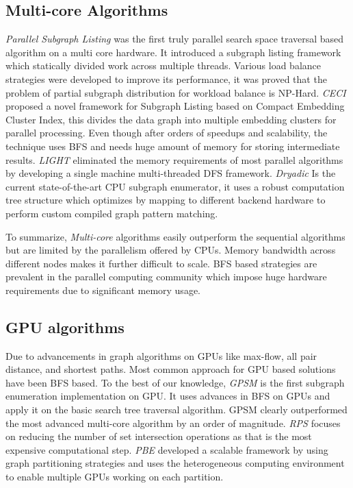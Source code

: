 \subsection{Multi-core Algorithms} \label{sec:lit-par}
\textit{Parallel Subgraph Listing} \cite{psgl} was the first truly parallel search space traversal based algorithm on a multi core hardware. It introduced a subgraph listing framework which statically divided work across multiple threads.
Various load balance strategies were developed to improve its performance, it was proved that the problem of partial subgraph distribution for workload balance is NP-Hard.
\textit{CECI} \cite{CECI} proposed a novel framework for Subgraph Listing based on Compact Embedding Cluster Index, this divides the data graph into multiple embedding clusters for parallel processing.
Even though after orders of speedups and scalability, the technique uses BFS and needs huge amount of memory for storing intermediate results.
\textit{LIGHT} \cite{LIGHT} eliminated the memory requirements of most parallel algorithms by developing a single machine multi-threaded DFS framework.
\textit{Dryadic} \cite{Dryadic} Is the current state-of-the-art CPU subgraph enumerator, it uses a robust computation tree structure which optimizes by mapping to different backend hardware to perform custom compiled graph pattern matching.

To summarize, \textit{Multi-core} algorithms easily outperform the sequential algorithms but are limited by the parallelism offered by CPUs.
Memory bandwidth across different nodes makes it further difficult to scale.
BFS based strategies are prevalent in the parallel computing community which impose huge hardware requirements due to significant memory usage.

\subsection{GPU algorithms} \label{sec:lit-gpu}
Due to advancements in graph algorithms on GPUs like max-flow, all pair distance, and shortest paths. Most common approach for GPU based solutions have been BFS based.
To the best of our knowledge, \textit{GPSM} \cite{GPSM} is the first subgraph enumeration implementation on GPU.
It uses advances in BFS on GPUs and apply it on the basic search tree traversal algorithm. GPSM clearly outperformed the most advanced multi-core algorithm by an  order of magnitude.
\textit{RPS} \cite{RPS-paper} focuses on reducing the number of set intersection operations as that is the most expensive computational step.
\textit{PBE} \cite{PBE-paper} developed a scalable framework by using graph partitioning strategies and uses the heterogeneous computing environment to enable multiple GPUs working on each partition.

